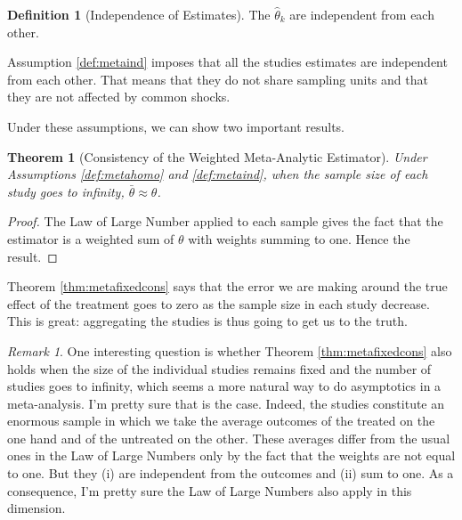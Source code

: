 \documentclass[
]{book}
\newtheorem{theorem}{Theorem}[chapter]
\theoremstyle{definition}
\newtheorem{definition}{Definition}[chapter]
\theoremstyle{definition}
\theoremstyle{definition}
\theoremstyle{definition}
\theoremstyle{remark}
\newtheorem*{remark}{Remark}
\begin{document}
\begin{definition}[Independence of Estimates]
\protect\hypertarget{def:metaind}{}{\label{def:metaind} \iffalse (Independence of Estimates) \fi{} }The \(\hat{\theta}_k\) are independent from each other.
\end{definition}

Assumption \ref{def:metaind} imposes that all the studies estimates are independent from each other.
That means that they do not share sampling units and that they are not affected by common shocks.

Under these assumptions, we can show two important results.

\begin{theorem}[Consistency of the Weighted Meta-Analytic Estimator]
\protect\hypertarget{thm:metafixedcons}{}{\label{thm:metafixedcons} \iffalse (Consistency of the Weighted Meta-Analytic Estimator) \fi{} }Under Assumptions \ref{def:metahomo} and \ref{def:metaind}, when the sample size of each study goes to infinity, \(\bar{\theta}\approx\theta\).
\end{theorem}

\begin{proof}
\iffalse{} {Proof. } \fi{}The Law of Large Number applied to each sample gives the fact that the estimator is a weighted sum of \(\theta\) with weights summing to one.
Hence the result.
\end{proof}

Theorem \ref{thm:metafixedcons} says that the error we are making around the true effect of the treatment goes to zero as the sample size in each study decrease.
This is great: aggregating the studies is thus going to get us to the truth.

\begin{remark}
\iffalse{} {Remark. } \fi{}One interesting question is whether Theorem \ref{thm:metafixedcons} also holds when the size of the individual studies remains fixed and the number of studies goes to infinity, which seems a more natural way to do asymptotics in a meta-analysis.
I'm pretty sure that is the case.
Indeed, the studies constitute an enormous sample in which we take the average outcomes of the treated on the one hand and of the untreated on the other.
These averages differ from the usual ones in the Law of Large Numbers only by the fact that the weights are not equal to one.
But they (i) are independent from the outcomes and (ii) sum to one.
As a consequence, I'm pretty sure the Law of Large Numbers also apply in this dimension.
\end{remark}
\end{document}
